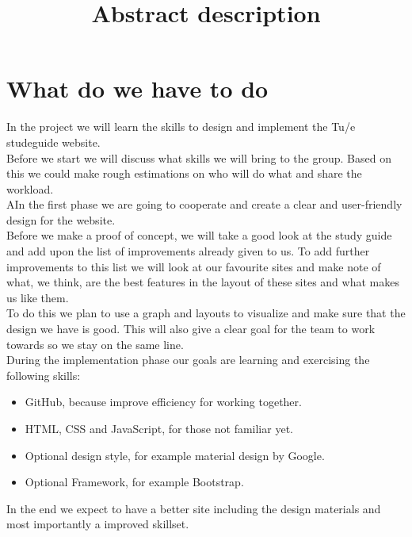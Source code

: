 \documentclass[a4paper,10pt]{article}
\title{Abstract description}
\begin{document}
\maketitle
\section*{What do we have to do}
In the project we will learn the skills to design and implement the Tu/e studeguide website.\\
Before we start we will discuss what skills we will bring to the group. Based on this we could make rough estimations on who will do what and share the workload.\\
AIn the first phase we are going to cooperate and create a clear and user-friendly design for the website.\\
Before we make a proof of concept, we will take a good look at the study guide and add upon the list of improvements already given to us. To add further improvements to this list we will look at our favourite sites and make note of what, we think, are the best features in the layout of these sites and what makes us like them.\\
To do this we plan to use a graph and layouts to visualize and make sure that the design we have is good. This will also give a clear goal for the team to work towards so we stay on the same line.\\
During the implementation phase our goals are learning and exercising the following skills:\\
\begin{itemize}
  \item GitHub, because improve efficiency for working together.
  \item HTML, CSS and JavaScript, for those not familiar yet.
  \item Optional design style, for example material design by Google.
  \item Optional Framework, for example Bootstrap.
\end{itemize}
In the end we expect to have a better site including the design materials and most importantly a improved skillset.\\
\end{document}
